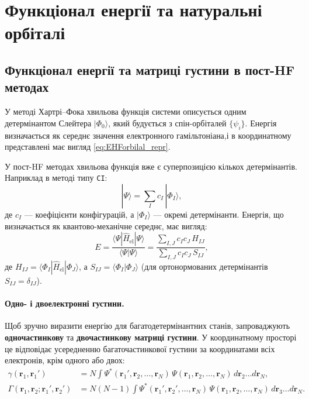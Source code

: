 
\section{Функціонал енергії та натуральні орбіталі}

\subsection{Функціонал енергії та матриці густини в пост-HF методах}

У методі Хартрі–Фока хвильова функція системи описується одним детермінантом
Слейтера $|\Phi_0\rangle$, який будується з спін-орбіталей $\{\psi_i\}$.
Енергія визначається як середнє значення електронного гамільтоніана,і в координатному представлені має вигляд \eqref{eq:EHForbilal_repr}.

У пост-HF методах хвильова функція вже є суперпозицією кількох
детермінантів. Наприклад в методі типу \texttt{CI}:
\[
	|\Psi\rangle = \sum_I c_I\,|\Phi_I\rangle,
\]
де $c_I$ --- коефіцієнти конфігурацій, а $|\Phi_I\rangle$ --- окремі детермінанти.
Енергія, що визначається як квантово-механічне середнє, має вигляд:
\[
	E =
	\frac{\langle \Psi | \hat{H}_\text{el} | \Psi \rangle}
	{\langle \Psi | \Psi \rangle}
	= \frac{\sum_{I,J} c_I c_J\, H_{IJ}}
	{\sum_{I,J} c_I c_J\, S_{IJ}},
\]
де $H_{IJ} = \langle \Phi_I | \hat{H}_\text{el} | \Phi_J \rangle$,
а $S_{IJ} = \langle \Phi_I | \Phi_J \rangle$
(для ортонормованих детермінантів $S_{IJ}=\delta_{IJ}$).

\paragraph{Одно- і двоелектронні густини.}
Щоб зручно виразити енергію для багатодетермінантних станів,
запроваджують \textbf{одночастинкову} та \textbf{двочастинкову матриці густини}.
У координатному просторі це відповідає усередненню багаточастинкової густини
за координатами всіх електронів, крім одного або двох:
\begin{align}
	\gamma(\mathbf{r}_1,\mathbf{r}_1')                            & = N
	\int \Psi^*(\mathbf{r}_1',\mathbf{r}_2,\ldots,\mathbf{r}_N)\,
	\Psi(\mathbf{r}_1,\mathbf{r}_2,\ldots,\mathbf{r}_N)\, d\mathbf{r}_2\ldots d\mathbf{r}_N, \\[4pt]
	\Gamma(\mathbf{r}_1,\mathbf{r}_2;\mathbf{r}_1',\mathbf{r}_2') & =
	N(N-1)
	\int \Psi^*(\mathbf{r}_1',\mathbf{r}_2',\ldots,\mathbf{r}_N)\,
	\Psi(\mathbf{r}_1,\mathbf{r}_2,\ldots,\mathbf{r}_N)\, d\mathbf{r}_3\ldots d\mathbf{r}_N.
\end{align}

